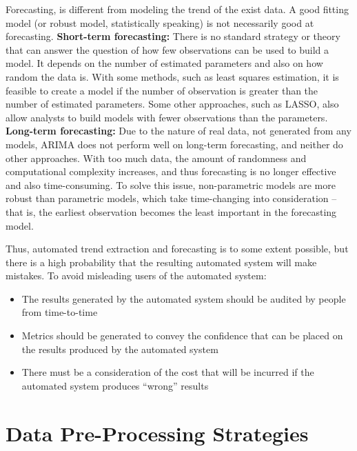 Forecasting, is different from modeling the trend of the exist data. A good fitting model (or robust model, statistically speaking) is not necessarily good at forecasting. 
\textbf{Short-term forecasting:}  There is no standard strategy or theory that can answer the question of how few observations can be used to build a model. It depends on the number of estimated parameters and also on how random the data is. With some methods, such as least squares estimation, it is feasible to create a model if the number of observation is greater than the number of estimated parameters. Some other approaches, such as LASSO, also allow analysts to build models with fewer observations than the parameters. 
\textbf{Long-term forecasting:}  Due to the nature of real data, not generated from any models, ARIMA does not perform well on long-term forecasting, and neither do other approaches. With too much data, the amount of randomness and computational complexity increases, and thus forecasting is no longer effective and also time-consuming. To solve this issue, non-parametric models are more robust than parametric models, which take time-changing into consideration -- that is, the earliest observation becomes the least important in the forecasting model. 

Thus, automated trend extraction and forecasting is to some extent possible, but there is a high probability that the resulting automated system will make mistakes. To avoid misleading users of the automated system:
 \begin{itemize}[noitemsep]
\item The results generated by the automated system should be audited by people from time-to-time
\item Metrics should be generated to convey the confidence that can be placed on the results produced by the automated system
\item There must be a consideration of the cost that will be incurred if the automated system produces ``wrong'' results
\end{itemize}

\section{Data Pre-Processing Strategies}

